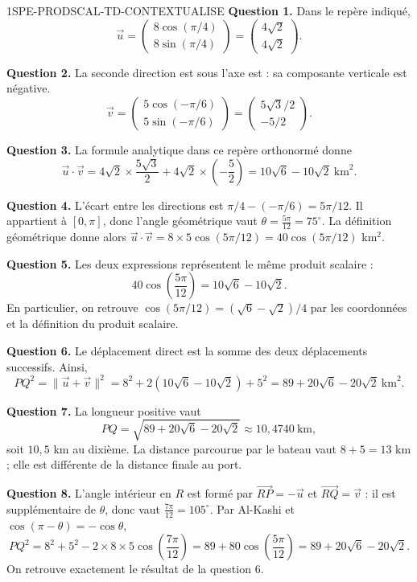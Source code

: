 \ifnxVersionProfesseur
\begin{corrige}{1SPE-PRODSCAL-TD-CONTEXTUALISE}
\textbf{Question 1.}
Dans le repère indiqué,
\[
\vec u=\begin{pmatrix}8\cos(\pi/4)\\8\sin(\pi/4)\end{pmatrix}
=\begin{pmatrix}4\sqrt2\\4\sqrt2\end{pmatrix}.
\]

\textbf{Question 2.}
La seconde direction est sous l'axe est : sa composante verticale est négative.
\[
\vec v=\begin{pmatrix}5\cos(-\pi/6)\\5\sin(-\pi/6)\end{pmatrix}
=\begin{pmatrix}5\sqrt3/2\\-5/2\end{pmatrix}.
\]

\textbf{Question 3.}
La formule analytique dans ce repère orthonormé donne
\[
\vec u\cdot\vec v
=4\sqrt2\times\frac{5\sqrt3}{2}+4\sqrt2\times\left(-\frac52\right)
=10\sqrt6-10\sqrt2\ \text{km}^2.
\]

\textbf{Question 4.}
L'écart entre les directions est $\pi/4-(-\pi/6)=5\pi/12$.
Il appartient à $[0,\pi]$, donc l'angle géométrique vaut
$\theta=\frac{5\pi}{12}=75^\circ$.
La définition géométrique donne alors
$\vec u\cdot\vec v=8\times5\cos(5\pi/12)=40\cos(5\pi/12)$ km$^2$.

\textbf{Question 5.}
Les deux expressions représentent le même produit scalaire :
\[
40\cos\left(\frac{5\pi}{12}\right)=10\sqrt6-10\sqrt2.
\]
En particulier, on retrouve
$\cos(5\pi/12)=(\sqrt6-\sqrt2)/4$ par les coordonnées et la définition du produit scalaire.

\textbf{Question 6.}
Le déplacement direct est la somme des deux déplacements successifs. Ainsi,
\[
PQ^2=\|\vec u+\vec v\|^2
=8^2+2(10\sqrt6-10\sqrt2)+5^2
=89+20\sqrt6-20\sqrt2\ \text{km}^2.
\]

\textbf{Question 7.}
La longueur positive vaut
\[
PQ=\sqrt{89+20\sqrt6-20\sqrt2}
\approx10{,}4740\ \text{km},
\]
soit $10{,}5$ km au dixième.
La distance parcourue par le bateau vaut $8+5=13$ km ; elle est différente de la distance finale au port.

\textbf{Question 8.}
L'angle intérieur en $R$ est formé par $\overrightarrow{RP}=-\vec u$ et
$\overrightarrow{RQ}=\vec v$ : il est supplémentaire de $\theta$,
donc vaut $\frac{7\pi}{12}=105^\circ$.
Par Al-Kashi et $\cos(\pi-\theta)=-\cos\theta$,
\[
PQ^2=8^2+5^2-2\times8\times5\cos\left(\frac{7\pi}{12}\right)
=89+80\cos\left(\frac{5\pi}{12}\right)
=89+20\sqrt6-20\sqrt2.
\]
On retrouve exactement le résultat de la question 6.


\end{corrige}
